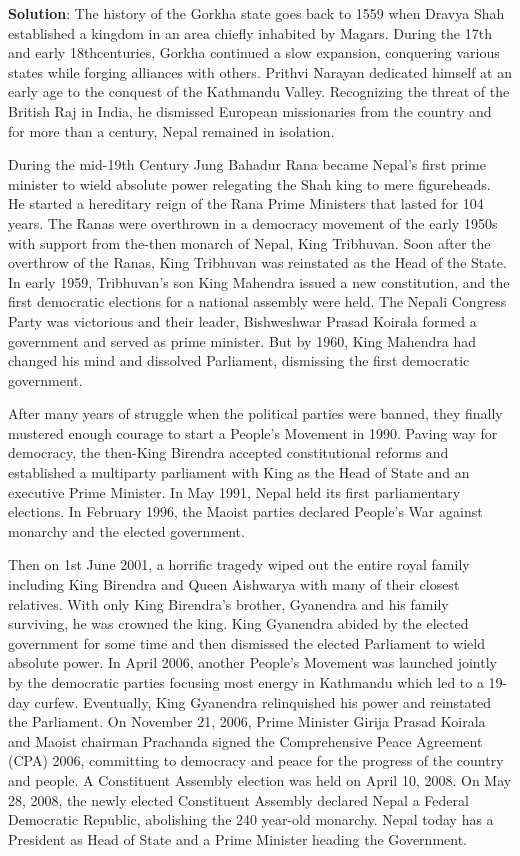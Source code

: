 \documentclass[
  openany]{book}
\newenvironment{solution}{ {\bfseries Solution}:}{}
\begin{document}
\begin{questions}
\begin{solution}
The history of the Gorkha state goes back to 1559 when Dravya Shah established a kingdom in an area chiefly inhabited by Magars. During the 17th and early 18thcenturies, Gorkha continued a slow expansion, conquering various states while forging alliances with others. Prithvi Narayan dedicated himself at an early age to the conquest of the Kathmandu Valley. Recognizing the threat of the British Raj in India, he dismissed European missionaries from the country and for more than a century, Nepal remained in isolation.

During the mid-19th Century Jung Bahadur Rana became Nepal’s first prime minister to wield absolute power relegating the Shah king to mere figureheads. He started a hereditary reign of the Rana Prime Ministers that lasted for 104 years. The Ranas were overthrown in a democracy movement of the early 1950s with support from the-then monarch of Nepal, King Tribhuvan. Soon after the overthrow of the Ranas, King Tribhuvan was reinstated as the Head of the State. In early 1959, Tribhuvan’s son King Mahendra issued a new constitution, and the first democratic elections for a national assembly were held. The Nepali Congress Party was victorious and their leader, Bishweshwar Prasad Koirala formed a government and served as prime minister. But by 1960, King Mahendra had changed his mind and dissolved Parliament, dismissing the first democratic government.

After many years of struggle when the political parties were banned, they finally mustered enough courage to start a People’s Movement in 1990. Paving way for democracy, the then-King Birendra accepted constitutional reforms and established a multiparty parliament with King as the Head of State and an executive Prime Minister. In May 1991, Nepal held its first parliamentary elections. In February 1996, the Maoist parties declared People’s War against monarchy and the elected government.

Then on 1st June 2001, a horrific tragedy wiped out the entire royal family including King Birendra and Queen Aishwarya with many of their closest relatives. With only King Birendra’s brother, Gyanendra and his family surviving, he was crowned the king. King Gyanendra abided by the elected government for some time and then dismissed the elected Parliament to wield absolute power. In April 2006, another People’s Movement was launched jointly by the democratic parties focusing most energy in Kathmandu which led to a 19-day curfew. Eventually, King Gyanendra relinquished his power and reinstated the Parliament. On November 21, 2006, Prime Minister Girija Prasad Koirala and Maoist chairman Prachanda signed the Comprehensive Peace Agreement (CPA) 2006, committing to democracy and peace for the progress of the country and people. A Constituent Assembly election was held on April 10, 2008. On May 28, 2008, the newly elected Constituent Assembly declared Nepal a Federal Democratic Republic, abolishing the 240 year-old monarchy. Nepal today has a President as Head of State and a Prime Minister heading the Government.


\end{solution}
\end{questions}
\end{document}
